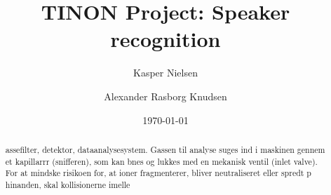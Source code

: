 

\usepackage[footnote,draft,english,silent,nomargin]{fixme}



\title{TINON Project: Speaker recognition}

\author{Kasper Nielsen}%
\author{Alexander Rasborg Knudsen}%
\date{\today} %

\begin{abstract}
\bigskip
assefilter, detektor, dataanalysesystem. 
Gassen til analyse suges ind i maskinen gennem et kapillarrr (snifferen), som kan bnes og lukkes med en mekanisk ventil (inlet valve). 
For at mindske risikoen for, at ioner fragmenterer, bliver neutraliseret eller spredt p hinanden, skal kollisionerne imelle\cite{RefWorks:23}
\end{abstract}

\maketitle
\noindent
















